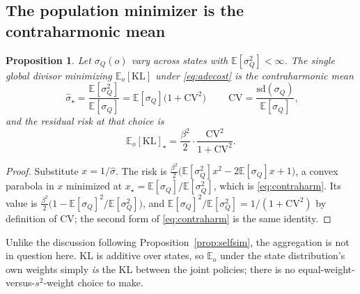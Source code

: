 \documentclass[11pt]{article}
\newtheorem{proposition}{Proposition}
\theoremstyle{definition}
\newcommand{\E}{\mathbb{E}}
\begin{document}
\subsection{The population minimizer is the contraharmonic mean}

\begin{proposition}
\label{prop:contraharm}
Let $\sigma_Q(o)$ vary across states with $\E[\sigma_Q^2]<\infty$. The single
global divisor minimizing $\E_o[\mathrm{KL}]$ under \eqref{eq:advcost} is the
\emph{contraharmonic mean}
\begin{equation}
  \boxed{\;\hat\sigma_\star=\frac{\E[\sigma_Q^2]}{\E[\sigma_Q]}
  =\E[\sigma_Q]\big(1+\mathrm{CV}^2\big)\;}
  \qquad
  \mathrm{CV}=\frac{\mathrm{sd}(\sigma_Q)}{\E[\sigma_Q]},
  \label{eq:contraharm}
\end{equation}
and the residual risk at that choice is
\begin{equation}
  \E_o[\mathrm{KL}]_\star=\frac{\beta^2}{2}\cdot\frac{\mathrm{CV}^2}{1+\mathrm{CV}^2}.
  \label{eq:advfloor}
\end{equation}
\end{proposition}

\begin{proof}
Substitute $x=1/\hat\sigma$. The risk is
$\tfrac{\beta^2}{2}\big(\E[\sigma_Q^2]x^2-2\E[\sigma_Q]x+1\big)$, a convex
parabola in $x$ minimized at $x_\star=\E[\sigma_Q]/\E[\sigma_Q^2]$, which is
\eqref{eq:contraharm}. Its value is
$\tfrac{\beta^2}{2}\big(1-\E[\sigma_Q]^2/\E[\sigma_Q^2]\big)$, and
$\E[\sigma_Q]^2/\E[\sigma_Q^2]=1/(1+\mathrm{CV}^2)$ by definition of $\mathrm{CV}$;
the second form of \eqref{eq:contraharm} is the same identity.
\end{proof}

Unlike the discussion following Proposition~\ref{prop:selfsim}, the aggregation
is not in question here. KL is additive over states, so $\E_o$ under the state
distribution's own weights simply \emph{is} the KL between the joint policies;
there is no equal-weight-versus-$s^2$-weight choice to make.
\end{document}
